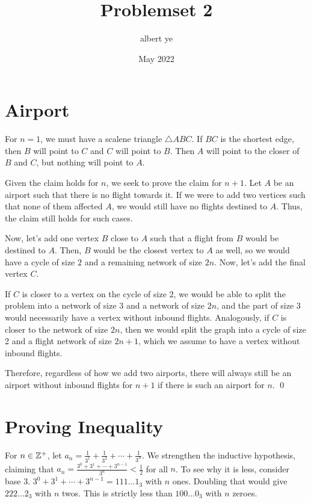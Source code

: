 \documentclass{article}
\title{Problemset 2}
\author{albert ye}
\date{May 2022}
\begin{document}
\maketitle

\section{Airport}
For $n=1$, we must have a scalene triangle $\triangle ABC$. If $BC$ is 
the shortest edge, then $B$ will point to $C$ and $C$ will point to $B$. Then 
$A$ will point to the closer of $B$ and $C$, but nothing will point to $A$.

Given the claim holds for $n$, we seek to prove the claim for $n+1$. Let $A$
be an airport such that there is no flight towards it. If we were to add two 
vertices such that none of them affected $A$, we would still have no flights 
destined to $A$. Thus, the claim still holds for such cases. 

Now, let's add one vertex $B$ close to $A$ such that a flight from $B$ would be destined to $A$. Then, 
$B$ would be the closest vertex to $A$ as well, so we would have a cycle of size $2$
and a remaining network of size $2n$. Now, let's add the final vertex $C$. 

If $C$ is
closer to a vertex on the cycle of size $2$, we would be able to split the problem 
into a network of size $3$ and a network of size $2n$, and the part of size $3$ would 
necessarily have a vertex without inbound flights. Analogously, if $C$ is closer to 
the network of size $2n$, then we would split the graph into a cycle of size 2 
and a flight network of size $2n+1$, which we assume to have a vertex without inbound flights. 

Therefore, regardless of how we add two airports, there will 
always still be an airport without inbound flights for $n+1$ if there is such 
an airport for $n$. \qed

\section{Proving Inequality}
For $n \in \mathbb Z^+$, let $a_n = \frac{1}{3^1} + \frac{1}{3^2} + \cdots + \frac{1}{3^n}$.
We strengthen the inductive hypothesis, claiming that 
$a_n = \frac{3^0 + 3^1 + \cdots + 3^{n-1}}{3^n} < \frac{1}{2}$ for all $n$.
To see why it is less, consider base 3. $3^0 + 3^1 + \cdots + 3^{n-1} = 111\ldots1_3$ with $n$ ones.
Doubling that would give $222\ldots2_3$ with $n$ twos. This is strictly less than 
$100\ldots0_3$ with $n$ zeroes.
\end{document}
